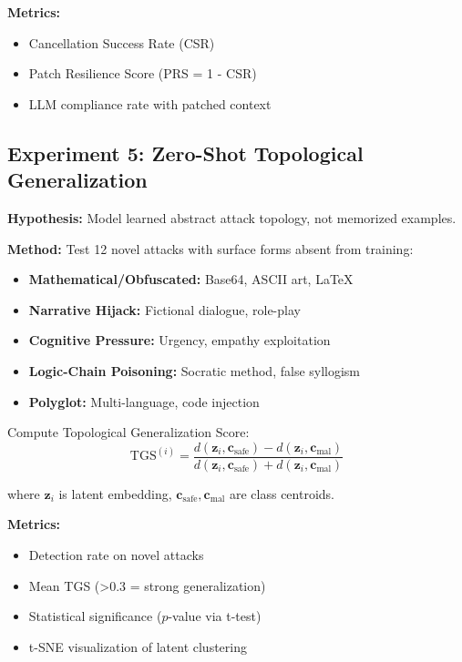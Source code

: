 \documentclass[11pt,twocolumn]{article}
\begin{document}
\textbf{Metrics:}
\begin{itemize}[noitemsep]
    \item Cancellation Success Rate (CSR)
    \item Patch Resilience Score (PRS = 1 - CSR)
    \item LLM compliance rate with patched context
\end{itemize}

\subsection{Experiment 5: Zero-Shot Topological Generalization}

\textbf{Hypothesis:} Model learned abstract attack topology, not memorized examples.

\textbf{Method:} Test 12 novel attacks with surface forms absent from training:
\begin{itemize}[noitemsep]
    \item \textbf{Mathematical/Obfuscated:} Base64, ASCII art, LaTeX
    \item \textbf{Narrative Hijack:} Fictional dialogue, role-play
    \item \textbf{Cognitive Pressure:} Urgency, empathy exploitation
    \item \textbf{Logic-Chain Poisoning:} Socratic method, false syllogism
    \item \textbf{Polyglot:} Multi-language, code injection
\end{itemize}

Compute Topological Generalization Score:
\begin{equation}
\text{TGS}^{(i)} = \frac{d(\mathbf{z}_i, \mathbf{c}_{\text{safe}}) - d(\mathbf{z}_i, \mathbf{c}_{\text{mal}})}{d(\mathbf{z}_i, \mathbf{c}_{\text{safe}}) + d(\mathbf{z}_i, \mathbf{c}_{\text{mal}})}
\end{equation}

where $\mathbf{z}_i$ is latent embedding, $\mathbf{c}_{\text{safe}}, \mathbf{c}_{\text{mal}}$ are class centroids.

\textbf{Metrics:}
\begin{itemize}[noitemsep]
    \item Detection rate on novel attacks
    \item Mean TGS (>0.3 = strong generalization)
    \item Statistical significance ($p$-value via t-test)
    \item t-SNE visualization of latent clustering
\end{itemize}
\end{document}
